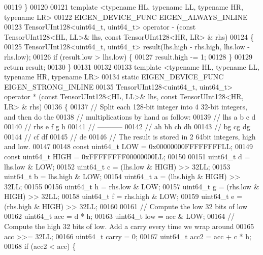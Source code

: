 \begin{DoxyCode}
00119 \}
00120 
00121 \textcolor{keyword}{template} <\textcolor{keyword}{typename} HL, \textcolor{keyword}{typename} LL, \textcolor{keyword}{typename} HR, \textcolor{keyword}{typename} LR>
00122 EIGEN\_DEVICE\_FUNC EIGEN\_ALWAYS\_INLINE
00123 TensorUInt128<uint64\_t, uint64\_t> operator - (\textcolor{keyword}{const} TensorUInt128<HL, LL>& lhs, \textcolor{keyword}{const} TensorUInt128<HR, LR>
      & rhs)
00124 \{
00125   TensorUInt128<uint64\_t, uint64\_t> result(lhs.high - rhs.high, lhs.low - rhs.low);
00126   \textcolor{keywordflow}{if} (result.low > lhs.low) \{
00127     result.high -= 1;
00128   \}
00129   \textcolor{keywordflow}{return} result;
00130 \}
00131 
00132 
00133 \textcolor{keyword}{template} <\textcolor{keyword}{typename} HL, \textcolor{keyword}{typename} LL, \textcolor{keyword}{typename} HR, \textcolor{keyword}{typename} LR>
00134 \textcolor{keyword}{static} EIGEN\_DEVICE\_FUNC EIGEN\_STRONG\_INLINE
00135 TensorUInt128<uint64\_t, uint64\_t> operator * (\textcolor{keyword}{const} TensorUInt128<HL, LL>& lhs, \textcolor{keyword}{const} TensorUInt128<HR, LR>
      & rhs)
00136 \{
00137   \textcolor{comment}{// Split each 128-bit integer into 4 32-bit integers, and then do the}
00138   \textcolor{comment}{// multiplications by hand as follow:}
00139   \textcolor{comment}{//   lhs      a  b  c  d}
00140   \textcolor{comment}{//   rhs      e  f  g  h}
00141   \textcolor{comment}{//           -----------}
00142   \textcolor{comment}{//           ah bh ch dh}
00143   \textcolor{comment}{//           bg cg dg}
00144   \textcolor{comment}{//           cf df}
00145   \textcolor{comment}{//           de}
00146   \textcolor{comment}{// The result is stored in 2 64bit integers, high and low.}
00147 
00148   \textcolor{keyword}{const} uint64\_t LOW = 0x00000000FFFFFFFFLL;
00149   \textcolor{keyword}{const} uint64\_t HIGH = 0xFFFFFFFF00000000LL;
00150 
00151   uint64\_t d = lhs.low & LOW;
00152   uint64\_t c = (lhs.low & HIGH) >> 32LL;
00153   uint64\_t b = lhs.high & LOW;
00154   uint64\_t a = (lhs.high & HIGH) >> 32LL;
00155 
00156   uint64\_t h = rhs.low & LOW;
00157   uint64\_t g = (rhs.low & HIGH) >> 32LL;
00158   uint64\_t f = rhs.high & LOW;
00159   uint64\_t e = (rhs.high & HIGH) >> 32LL;
00160 
00161   \textcolor{comment}{// Compute the low 32 bits of low}
00162   uint64\_t acc = d * h;
00163   uint64\_t low = acc & LOW;
00164   \textcolor{comment}{//  Compute the high 32 bits of low. Add a carry every time we wrap around}
00165   acc >>= 32LL;
00166   uint64\_t carry = 0;
00167   uint64\_t acc2 = acc + c * h;
00168   \textcolor{keywordflow}{if} (acc2 < acc) \{

\end{DoxyCode}
